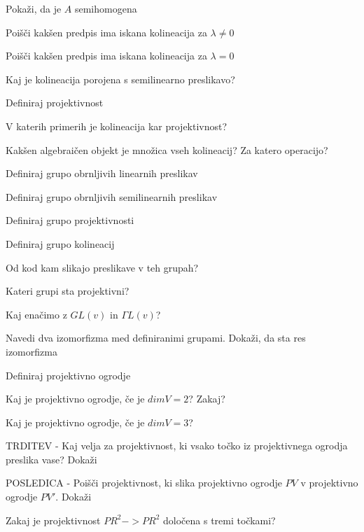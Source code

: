 \documentclass{article}
\begin{document}
\begin{enumerate}
\begin{itemize}
            {\color{red}\item Pokaži, da je $A$ semihomogena}
            {\color{red}\item Poišči kakšen predpis ima iskana kolineacija za $\lambda \neq 0$}
            {\color{red}\item Poišči kakšen predpis ima iskana kolineacija za $\lambda = 0$}
        \end{itemize}
        \item Kaj je kolineacija porojena s semilinearno preslikavo?
        \item Definiraj projektivnost
        \item V katerih primerih je kolineacija kar projektivnost?
        \item Kakšen algebraičen objekt je množica vseh kolineacij? Za katero operacijo?
        \item Definiraj grupo obrnljivih linearnih preslikav
        \item Definiraj grupo obrnljivih semilinearnih preslikav
        \item Definiraj grupo projektivnosti
        \item Definiraj grupo kolineacij
        \item Od kod kam slikajo preslikave v teh grupah?
        \item Kateri grupi sta projektivni?
        \item Kaj enačimo z $GL(v)$ in $\Gamma L(v)$?
        {\color{red}\item Navedi dva izomorfizma med definiranimi grupami. Dokaži, da sta res izomorfizma}
        {\color{red}\item Definiraj projektivno ogrodje}
        \item Kaj je projektivno ogrodje, če je $dimV = 2$? Zakaj?
        \item Kaj je projektivno ogrodje, če je $dimV = 3$? 
        {\color{blue}\item TRDITEV - Kaj velja za projektivnost, ki vsako točko iz projektivnega ogrodja preslika vase? Dokaži}
        {\color{red}\item POSLEDICA - Poišči projektivnost, ki slika projektivno ogrodje $PV$ v projektivno ogrodje $PV'$. Dokaži}
        \item Zakaj je projektivnost $PR^2 -> PR^2$ določena s tremi točkami? 
    \end{enumerate}
\end{document}
